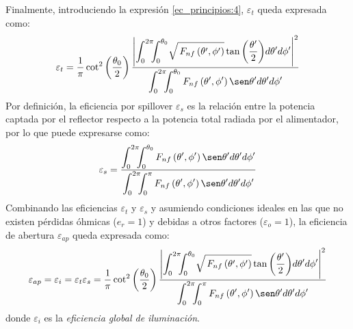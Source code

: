 Finalmente, introduciendo la expresión \eqref{ec_principios:4}, $\varepsilon_t$ queda expresada como:
\begin{align}
\varepsilon_t  = \dfrac{1}{\pi}\cot^2\left(\frac{\theta_0}{2}\right)\dfrac{\left|\displaystyle\int_0^{2\pi}\!\!\!\int_0^{\theta_0}\! \sqrt{\,F_{nf}\left(\theta ',\phi '\right)}\tan\left(\frac{\theta '}{2}\right)\!d\theta 'd\phi '\right|^2}{\displaystyle\int_0^{2\pi}\!\!\!\int_0^{\theta_0}F_{nf}\left(\theta ',\phi '\right)\sen\theta 'd\theta 'd\phi '}
\label{ec_principios:71}
\end{align}
Por definición, la eficiencia por spillover $\varepsilon_s$ es la relación entre la potencia captada por el reflector respecto a la potencia total radiada por el alimentador, por lo que puede expresarse como:
\begin{align}
\varepsilon_s  = \dfrac{\displaystyle\int_0^{2\pi}\!\!\!\int_0^{\theta_0}F_{nf}\left(\theta ',\phi '\right)\sen\theta 'd\theta 'd\phi '}{\displaystyle\int_0^{2\pi}\!\!\!\int_0^{\pi}F_{nf}\left(\theta ',\phi '\right)\sen\theta 'd\theta 'd\phi '}
\label{ec_principios:72}
\end{align}
Combinando las eficiencias $\varepsilon_t$ y $\varepsilon_s$ y asumiendo condiciones ideales en las que no existen pérdidas óhmicas ($e_r = 1$) y debidas a otros factores ($\varepsilon_o = 1$), la eficiencia de abertura $\varepsilon_{ap}$ queda expresada como:
\begin{align}
\varepsilon_{ap}  = \varepsilon_i = \varepsilon_t\varepsilon_s = \dfrac{1}{\pi}\cot^2\left(\frac{\theta_0}{2}\right)\dfrac{\left|\displaystyle\int_0^{2\pi}\!\!\!\int_0^{\theta_0}\! \sqrt{\,F_{nf}\left(\theta ',\phi '\right)}\tan\left(\frac{\theta '}{2}\right)\!d\theta 'd\phi '\right|^2}{\displaystyle\int_0^{2\pi}\!\!\!\int_0^{\pi}F_{nf}\left(\theta ',\phi '\right)\sen\theta 'd\theta 'd\phi '}
\label{ec_principios:73}
\end{align}
donde $\varepsilon_i$ es la \emph{eficiencia global de iluminación}.

